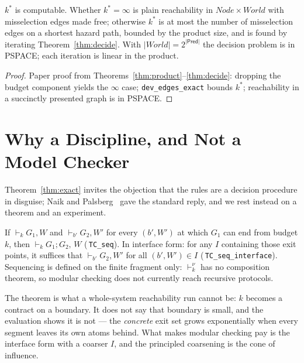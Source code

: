 \documentclass[a4paper,UKenglish,cleveref,autoref,thm-restate,anonymous]{lipics-v2021}
\newcommand{\Pred}{\mathsf{Pred}}
\newcommand{\safeT}[1]{\vdash_{#1}}
\newcommand{\safeRr}[1]{\vdash^{\nu}_{#1}}
\newcommand{\coqok}[1]{\textcolor{okgreen}{\ding{51}}\,\texttt{\small #1}}
\newcommand{\kstar}{k^{*}}
\begin{document}
\begin{proposition}\label{prop:degree}
$\kstar$ is computable. Whether $\kstar=\infty$ is plain reachability in
$\mathit{Node}\times\mathit{World}$ with misselection edges made free;
otherwise $\kstar$ is at most the number of misselection edges on a shortest
hazard path, bounded by the product size, and is found by iterating
Theorem~\ref{thm:decide}. With $|\mathit{World}|=2^{|\Pred|}$ the decision
problem is in PSPACE; each iteration is linear in the product.
\end{proposition}
\begin{proof}
Paper proof from Theorems~\ref{thm:product}--\ref{thm:decide}: dropping the
budget component yields the $\infty$ case; \texttt{dev\_edges\_exact} bounds
$\kstar$; reachability in a succinctly presented graph is in PSPACE.
\end{proof}

\section{Why a Discipline, and Not a Model Checker}\label{sec:why}

Theorem~\ref{thm:exact} invites the objection that the rules are a decision
procedure in disguise; Naik and Palsberg~\cite{naik-palsberg} gave the standard
reply, and we rest instead on a theorem and an experiment.


\begin{theorem}\label{thm:seq}
If $\safeT{k} G_1,W$ and $\safeT{b'} G_2,W'$ for every $(b',W')$ at which
$G_1$ can end from budget $k$, then $\safeT{k} G_1;G_2,\,W$ (\coqok{TC\_seq}).
In interface form: for any $I$ containing those exit points, it suffices that
$\safeT{b'} G_2,W'$ for all $(b',W')\in I$ (\coqok{TC\_seq\_interface}).
Sequencing is defined on the finite fragment only: $\safeRr{k}$ has no
composition theorem, so modular checking does not currently reach recursive
protocols.
\end{theorem}

The theorem is what a whole-system reachability run cannot be: $k$ becomes a
contract on a boundary. It does not say that boundary is small, and the
evaluation shows it is not --- the \emph{concrete} exit set grows exponentially
when every segment leaves its own atoms behind. What makes modular checking pay
is the interface form with a coarser $I$, and the principled coarsening is the
cone of influence.
\end{document}
